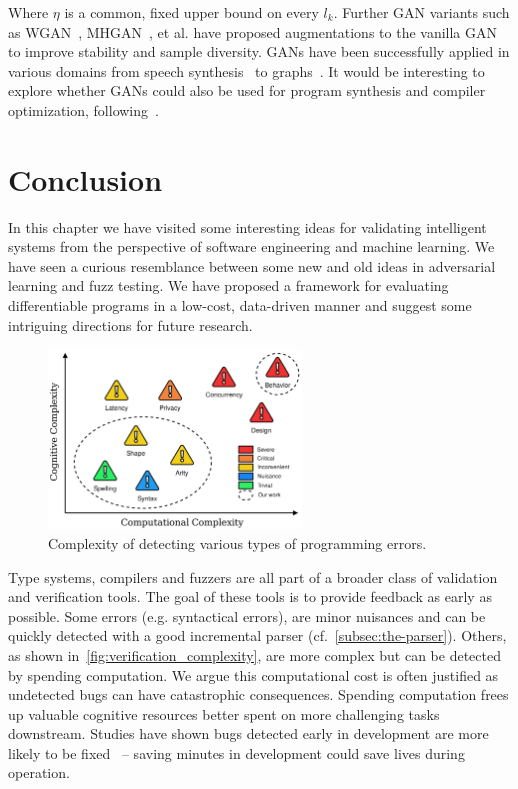 \documentclass[12pt,initial,twoside,maitrise]{dms}
\numberwithin{equation}{section}
\numberwithin{table}{chapter}
\numberwithin{figure}{chapter}
\begin{document}
Where $\eta$ is a common, fixed upper bound on every $l_k$. Further GAN variants such as WGAN~\citep{arjovsky2017wgan}, MHGAN~\citep{turner2019mhgan}, et al. have proposed augmentations to the vanilla GAN to improve stability and sample diversity. GANs have been successfully applied in various domains from speech synthesis~\citep{donahue2019wavegan} to graphs~\citep{wang2018graphgan}. It would be interesting to explore whether GANs could also be used for program synthesis and compiler optimization, following~\citep{adams2019learning}.

\section{Conclusion}

In this chapter we have visited some interesting ideas for validating intelligent systems from the perspective of software engineering and machine learning. We have seen a curious resemblance between some new and old ideas in adversarial learning and fuzz testing. We have proposed a framework for evaluating differentiable programs in a low-cost, data-driven manner and suggest some intriguing directions for future research.

\begin{figure}
\centering
\includegraphics[width=0.60\textwidth]{../figures/verification_complexity.png}
\caption{Complexity of detecting various types of programming errors.}
\label{fig:verification_complexity}
\end{figure}

Type systems, compilers and fuzzers are all part of a broader class of validation and verification tools. The goal of these tools is to provide feedback as early as possible. Some errors (e.g. syntactical errors), are minor nuisances and can be quickly detected with a good incremental parser (cf.~\autoref{subsec:the-parser}). Others, as shown in~\autoref{fig:verification_complexity}, are more complex but can be detected by spending computation. We argue this computational cost is often justified as undetected bugs can have catastrophic consequences. Spending computation frees up valuable cognitive resources better spent on more challenging tasks downstream. Studies have shown bugs detected early in development are more likely to be fixed~\citep{distefano2019scaling} -- saving minutes in development could save lives during operation.
\end{document}
